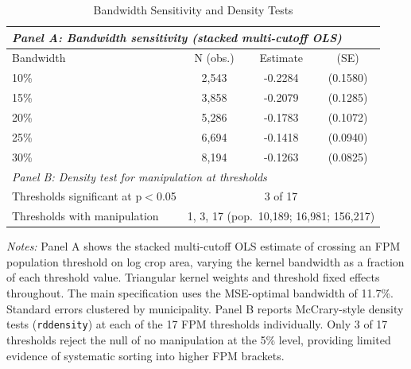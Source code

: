 \begin{table}[htbp]
\small
\centering
\caption{Bandwidth Sensitivity and Density Tests}
\label{tab:tab4_sensitivity}
\begin{tabular}{lccc}
\toprule
\multicolumn{4}{l}{\textit{Panel A: Bandwidth sensitivity (stacked multi-cutoff OLS)}} \\
\midrule
Bandwidth & N (obs.) & Estimate & (SE) \\
\midrule
10\% & 2,543 & -0.2284 & (0.1580) \\
15\% & 3,858 & -0.2079 & (0.1285) \\
20\% & 5,286 & -0.1783 & (0.1072) \\
25\% & 6,694 & -0.1418 & (0.0940) \\
30\% & 8,194 & -0.1263 & (0.0825) \\
\midrule
\multicolumn{4}{l}{\textit{Panel B: Density test for manipulation at thresholds}} \\
\midrule
Thresholds significant at p$<$0.05 & \multicolumn{3}{c}{3 of 17} \\
Thresholds with manipulation & \multicolumn{3}{c}{1, 3, 17 (pop.~10,189; 16,981; 156,217)} \\
\bottomrule
\end{tabular}
\begin{minipage}{0.95\textwidth}
\vspace{4pt}\scriptsize
\textit{Notes:} Panel A shows the stacked multi-cutoff OLS estimate of crossing an FPM population threshold on log crop area, varying the kernel bandwidth as a fraction of each threshold value. Triangular kernel weights and threshold fixed effects throughout. The main specification uses the MSE-optimal bandwidth of 11.7\%. Standard errors clustered by municipality. Panel B reports McCrary-style density tests (\texttt{rddensity}) at each of the 17 FPM thresholds individually. Only 3 of 17 thresholds reject the null of no manipulation at the 5\% level, providing limited evidence of systematic sorting into higher FPM brackets.
\end{minipage}
\end{table}

